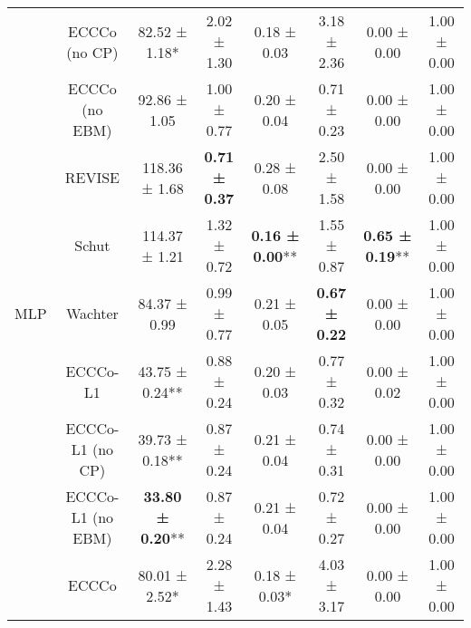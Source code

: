 \begin{table}
{\begin{tabular}[t]{cccccccc}
 & ECCCo (no CP) & 82.52 ± 1.18*\hphantom{*} & 2.02 ± 1.30\hphantom{*}\hphantom{*} & 0.18 ± 0.03\hphantom{*}\hphantom{*} & 3.18 ± 2.36\hphantom{*}\hphantom{*} & 0.00 ± 0.00\hphantom{*}\hphantom{*} & 1.00 ± 0.00\hphantom{*}\hphantom{*}\\

 & ECCCo (no EBM) & 92.86 ± 1.05\hphantom{*}\hphantom{*} & 1.00 ± 0.77\hphantom{*}\hphantom{*} & 0.20 ± 0.04\hphantom{*}\hphantom{*} & 0.71 ± 0.23\hphantom{*}\hphantom{*} & 0.00 ± 0.00\hphantom{*}\hphantom{*} & 1.00 ± 0.00\hphantom{*}\hphantom{*}\\

 & REVISE & 118.36 ± 1.68\hphantom{*}\hphantom{*} & \textbf{0.71 ± 0.37}\hphantom{*}\hphantom{*} & 0.28 ± 0.08\hphantom{*}\hphantom{*} & 2.50 ± 1.58\hphantom{*}\hphantom{*} & 0.00 ± 0.00\hphantom{*}\hphantom{*} & 1.00 ± 0.00\hphantom{*}\hphantom{*}\\

 & Schut & 114.37 ± 1.21\hphantom{*}\hphantom{*} & 1.32 ± 0.72\hphantom{*}\hphantom{*} & \textbf{0.16 ± 0.00}** & 1.55 ± 0.87\hphantom{*}\hphantom{*} & \textbf{0.65 ± 0.19}** & 1.00 ± 0.00\hphantom{*}\hphantom{*}\\

\multirow[t]{-10}{*}{\centering\arraybackslash MLP} & Wachter & 84.37 ± 0.99\hphantom{*}\hphantom{*} & 0.99 ± 0.77\hphantom{*}\hphantom{*} & 0.21 ± 0.05\hphantom{*}\hphantom{*} & \textbf{0.67 ± 0.22}\hphantom{*}\hphantom{*} & 0.00 ± 0.00\hphantom{*}\hphantom{*} & 1.00 ± 0.00\hphantom{*}\hphantom{*}\\
\cmidrule{1-8}
 & ECCCo-L1 & 43.75 ± 0.24** & 0.88 ± 0.24\hphantom{*}\hphantom{*} & 0.20 ± 0.03\hphantom{*}\hphantom{*} & 0.77 ± 0.32\hphantom{*}\hphantom{*} & 0.00 ± 0.02\hphantom{*}\hphantom{*} & 1.00 ± 0.00\hphantom{*}\hphantom{*}\\

 & ECCCo-L1 (no CP) & 39.73 ± 0.18** & 0.87 ± 0.24\hphantom{*}\hphantom{*} & 0.21 ± 0.04\hphantom{*}\hphantom{*} & 0.74 ± 0.31\hphantom{*}\hphantom{*} & 0.00 ± 0.00\hphantom{*}\hphantom{*} & 1.00 ± 0.00\hphantom{*}\hphantom{*}\\

 & ECCCo-L1 (no EBM) & \textbf{33.80 ± 0.20}** & 0.87 ± 0.24\hphantom{*}\hphantom{*} & 0.21 ± 0.04\hphantom{*}\hphantom{*} & 0.72 ± 0.27\hphantom{*}\hphantom{*} & 0.00 ± 0.00\hphantom{*}\hphantom{*} & 1.00 ± 0.00\hphantom{*}\hphantom{*}\\

 & ECCCo & 80.01 ± 2.52*\hphantom{*} & 2.28 ± 1.43\hphantom{*}\hphantom{*} & 0.18 ± 0.03*\hphantom{*} & 4.03 ± 3.17\hphantom{*}\hphantom{*} & 0.00 ± 0.00\hphantom{*}\hphantom{*} & 1.00 ± 0.00\hphantom{*}\hphantom{*}\\


\end{tabular}}
\end{table}

